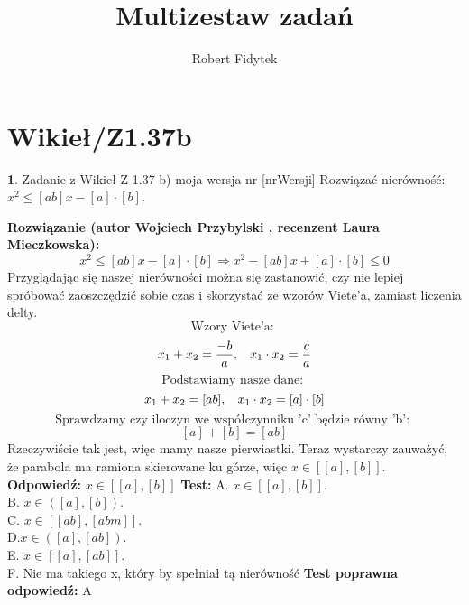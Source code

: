 \documentclass[12pt, a4paper]{article}
\title{Multizestaw zadań}
\author{Robert Fidytek}
\date{}
\theoremstyle{definition} %
\newtheorem{zad}{}
\newcommand{\kategoria}[1]{\section{#1}} %
\newcommand{\zadStart}[1]{\begin{zad}#1\newline} %
\newcommand{\zadStop}{\end{zad}}   %
\newcommand{\rozwStart}[2]{\noindent \textbf{Rozwiązanie (autor #1 , recenzent #2): }\newline} %
\newcommand{\rozwStop}{\newline}                                            %
\newcommand{\odpStart}{\noindent \textbf{Odpowiedź:}\newline}    %
\newcommand{\odpStop}{\newline}                                             %
\newcommand{\testStart}{\noindent \textbf{Test:}\newline} %
\newcommand{\testStop}{\newline} %
\newcommand{\kluczStart}{\noindent \textbf{Test poprawna odpowiedź:}\newline} %
\newcommand{\kluczStop}{\newline} %
\begin{document}
\maketitle


\kategoria{Wikieł/Z1.37b}
\zadStart{Zadanie z Wikieł Z 1.37 b) moja wersja nr [nrWersji]}
Rozwiązać nierówność: $x^{2}\leq[ab]x-[a]\cdot[b]$.
\zadStop
\rozwStart{Wojciech Przybylski}{Laura Mieczkowska}
$$x^{2}\leq[ab]x-[a]\cdot[b]\Rightarrow x^{2}-[ab]x+[a]\cdot[b]\leq0$$
Przyglądając się naszej nierówności można się zastanowić, czy nie lepiej spróbować zaoszczędzić sobie czas i skorzystać ze wzorów Viete'a, zamiast liczenia delty.
$$\mbox{Wzory Viete'a: }$$
$$ x_{1}+x_{2}=\frac{-b}{a},\hspace{3mm} x_{1}\cdot x_{2}=\frac{c}{a}$$
$$\mbox{Podstawiamy nasze dane: }$$
$$  x_{1}+x_{2}=[ab],\hspace{3mm}x_{1}\cdot x_{2}=[a]\cdot[b]$$
$$\mbox{Sprawdzamy czy iloczyn we współczynniku 'c' będzie równy 'b': }$$
$$ [a]+[b]=[ab]$$
Rzeczywiście tak jest, więc mamy nasze pierwiastki. Teraz wystarczy zauważyć, że parabola ma ramiona skierowane ku górze, więc $x\in[[a],[b]]$.
\rozwStop
\odpStart
$x\in[[a],[b]]$
\odpStop
\testStart
A. $x\in[[a],[b]]$.\\
B. $x\in([a],[b])$.\\
C. $x\in[[ab],[abm]]$.\\
D.$x\in([a],[ab])$.\\
E. $x\in[[a],[ab]]$.\\
F. Nie ma takiego x, który by spełniał tą nierówność
\testStop
\kluczStart
A
\kluczStop
\end{document}
